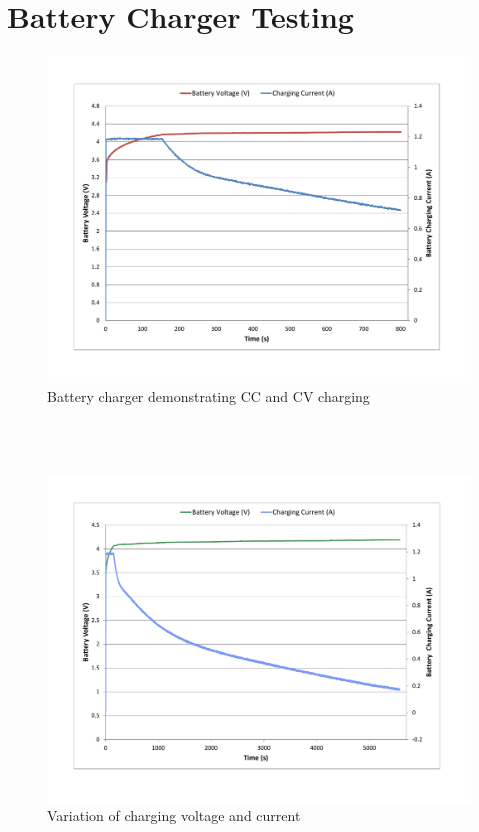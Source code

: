 \section{Battery Charger Testing}
\begin{figure}[H]
	\centering
	\includegraphics[width=\columnwidth]{IMGS/Battery CC CV.pdf}
	\caption{Battery charger demonstrating CC and CV charging}
	\label{fig:arch}
\end{figure}
\\ \\
\begin{figure}[H]
	\centering
	\includegraphics[width=\columnwidth]{IMGS/Battery Charge Cycle.pdf}
	\caption{Variation of charging voltage and current}
	\label{fig:arch}
\end{figure}
